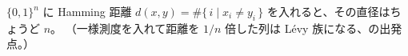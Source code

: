 $\{0,1\}^n$ に Hamming 距離 $d(x, y) = \#\{\, i \mid x_i \ne y_i \,\}$ を入れると、その直径はちょうど $n$。
（一様測度を入れて距離を $1/n$ 倍した列は Lévy 族になる、の出発点。）
